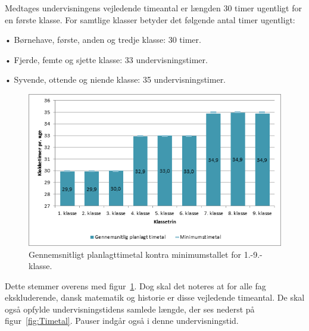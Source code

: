 Medtages undervisningens vejledende timeantal er længden 30 timer ugentligt for en første klasse. For samtlige klasser betyder det følgende antal timer ugentligt:

•	Børnehave, første, anden og tredje klasse: 30 timer.

•	Fjerde, femte og sjette klasse: 33 undervisningstimer.

•	Syvende, ottende og niende klasse: 35 undervisningstimer.


\begin{figure}[!hb]
  \centering
  \includegraphics[width=\textwidth]{partials/graphics/planlagttime.png}
  \caption{Gennemsnitligt planlagttimetal kontra minimumstallet for 1.-9.-klasse.}
  \label{fig:ugetal}
\end{figure}

Dette stemmer overens med figur~\ref{fig:ugetal}. Dog skal det noteres at for alle fag ekskluderende, dansk matematik og historie  er disse vejledende timeantal. De skal  også opfylde undervisningstidens samlede længde, der ses nederst på figur~\ref{fig:Timetal}. Pauser indgår også i denne undervisningstid.

